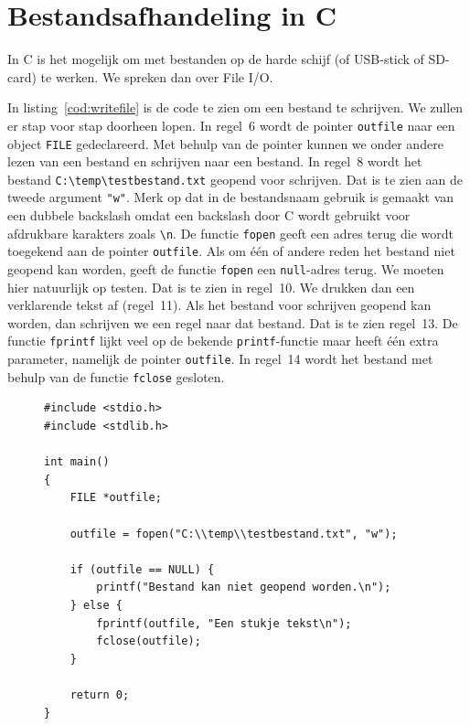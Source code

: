 \documentclass[a4paper,12pt,twoside]{article}
\begin{document}
\section{Bestandsafhandeling in C}
In C is het mogelijk om met bestanden op de harde schijf (of USB-stick of SD-card) te
werken. We spreken dan over File I/O.

In listing~\ref{cod:writefile} is de code te zien om een bestand te schrijven. We zullen
er stap voor stap doorheen lopen. In regel~6 wordt de pointer \lstinline|outfile| naar
een object \lstinline|FILE| gedeclareerd. Met behulp van de pointer kunnen we onder
andere lezen van een bestand en schrijven naar een bestand. In regel~8 wordt het
bestand \lstinline|C:\temp\testbestand.txt| geopend voor schrijven. Dat is te zien
aan de tweede argument \lstinline|"w"|. Merk op dat in de bestandsnaam gebruik is
gemaakt van een dubbele backslash omdat een backslash door C wordt gebruikt voor
afdrukbare karakters zoals \lstinline|\n|. De functie \lstinline|fopen| geeft een
adres terug die wordt toegekend aan de pointer \lstinline|outfile|. Als om \'e\'en
of andere reden het bestand niet geopend kan worden, geeft de functie \lstinline|fopen|
een \lstinline|null|-adres terug. We moeten hier natuurlijk op testen. Dat is te
zien in regel~10. We drukken dan een verklarende tekst af (regel~11). Als het
bestand voor schrijven geopend kan worden, dan schrijven we een regel naar dat
bestand. Dat is te zien regel~13. De functie \lstinline|fprintf| lijkt veel op de
bekende \lstinline|printf|-functie maar heeft \'e\'en extra parameter, namelijk
de pointer \lstinline|outfile|. In regel~14 wordt het bestand met behulp van de
functie \lstinline|fclose| gesloten.

\begin{figure}[H]
\begin{lstlisting}[caption=Voorbeeld schrijven naar een bestand.,label=cod:writefile]
#include <stdio.h>
#include <stdlib.h>

int main()
{
    FILE *outfile;

    outfile = fopen("C:\\temp\\testbestand.txt", "w");

    if (outfile == NULL) {
        printf("Bestand kan niet geopend worden.\n");
    } else {
        fprintf(outfile, "Een stukje tekst\n");
        fclose(outfile);
    }

    return 0;
}
\end{lstlisting}
\end{figure}
\end{document}
